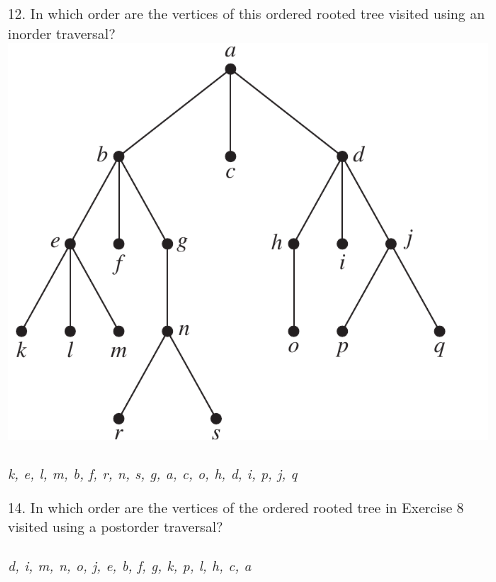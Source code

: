 \begin{itemize}
    \item[12.]  In which order are the vertices of this ordered rooted tree
          visited using an inorder traversal? \\
          \includegraphics[scale=0.6]{img/11_3_12_tree.png} \\
          \answer \\
         \textit{k, e, l, m, b, f, r, n, s, g, a, c, o, h, d, i, p, j, q}

    \item[14.] In which order are the vertices of the ordered rooted tree
in Exercise 8 visited using a postorder traversal?\\
\answer \\
\textit{d, i, m, n, o, j, e, b, f, g, k, p, l, h, c, a}


\end{itemize}
